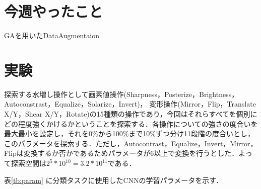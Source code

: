 \documentclass[twocolumn]{ujarticle}     %
\begin{document}

\section{今週やったこと}
 GAを用いたDataAugmentaion

\section{実験}
探索する水増し操作として画素値操作(Sharpness，Posterize，Brightness，Autoconstrast，Equalize，Solarize，Invert)，
変形操作(Mirror，Flip，Translate X/Y，Shear X/Y，Rotate)の15種類の操作であり，今回はそれらすべてを個別にどの程度強くかけるかということを探索する．各操作についての強さの度合いを最大最小を設定し，それを0\%から100\%まで10\%ずつ分け11段階の度合いとし，このパラメータを探索する．ただし，Autocontrast，Equalize，Invert，Mirror，Flipは変換するか否かであるためパラメータが6以上で変換を行うとした．よって探索空間は$2^5*10^{10}=3.2*10^{11}$である．

表\ref{tb:param}	に分類タスクに使用したCNNの学習パラメータを示す．
\end{document}
